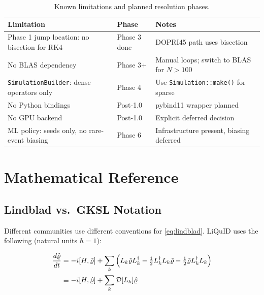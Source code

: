 \documentclass[11pt,a4paper,twoside]{book}
\newcommand{\densmat}{\hat{\varrho}}    %
\newcommand{\code}[1]{\texttt{\small#1}}
\theoremstyle{definition}
\theoremstyle{remark}
\begin{document}
\begin{table}[H]
\centering
\caption{Known limitations and planned resolution phases.}
\label{tab:limitations}
\begin{tabularx}{\linewidth}{L{55mm}L{15mm}X}
\toprule
\textbf{Limitation} & \textbf{Phase} & \textbf{Notes} \\
\midrule
Phase 1 jump location: no bisection for RK4 & Phase 3 done & DOPRI45 path uses bisection \\
No BLAS dependency & Phase 3+ & Manual loops; switch to BLAS for $N > 100$ \\
\code{SimulationBuilder}: dense operators only & Phase 4 & Use \code{Simulation::make()} for sparse \\
No Python bindings & Post-1.0 & pybind11 wrapper planned \\
No GPU backend & Post-1.0 & Explicit deferred decision \\
ML policy: seeds only, no rare-event biasing & Phase 6 & Infrastructure present, biasing deferred \\
\bottomrule
\end{tabularx}
\end{table}

\appendix

\chapter{Mathematical Reference}
\label{app:math}

\section{Lindblad vs.\ GKSL Notation}
\label{app:notation}

Different communities use different conventions for \cref{eq:lindblad}.
LiQuID uses the following (natural units $\hbar = 1$):

\begin{align}
  \frac{d\densmat}{dt}
    &= -i[H, \densmat]
     + \sum_k \left(L_k\densmat L_k^\dagger
       - \tfrac{1}{2}L_k^\dagger L_k\densmat
       - \tfrac{1}{2}\densmat L_k^\dagger L_k\right) \notag\\
    &\equiv -i[H, \densmat]
     + \sum_k \mathcal{D}[L_k]\densmat
  \label{eq:lindblad-dissipator}
\end{align}
\end{document}
